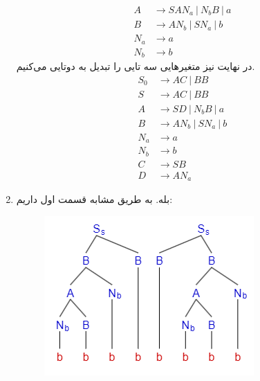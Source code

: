 \begin{enumerate}
\begin{align*}
        A &\rightarrow SAN_a ~|~ N_bB ~|~ a\\
        B &\rightarrow AN_b ~|~ SN_a ~|~ b\\
        N_a &\rightarrow a\\
        N_b &\rightarrow b
    \end{align*}
    در نهایت نیز متغیر‌هایی سه تایی را تبدیل به دوتایی می‌کنیم.
    \begin{align*}
        S_0 &\rightarrow AC ~|~ BB\\
        S &\rightarrow AC ~|~ BB\\
        A &\rightarrow SD ~|~ N_bB ~|~ a\\
        B &\rightarrow AN_b ~|~ SN_a ~|~ b\\
        N_a &\rightarrow a\\
        N_b &\rightarrow b\\
        C &\rightarrow SB\\
        D &\rightarrow AN_a
    \end{align*}
    \item بله. به طریق مشابه قسمت اول داریم:
    \begin{figure}[H]
        \centering
        \includegraphics[scale=0.5]{pics/1-3-3.png}
    \end{figure}
\end{enumerate}